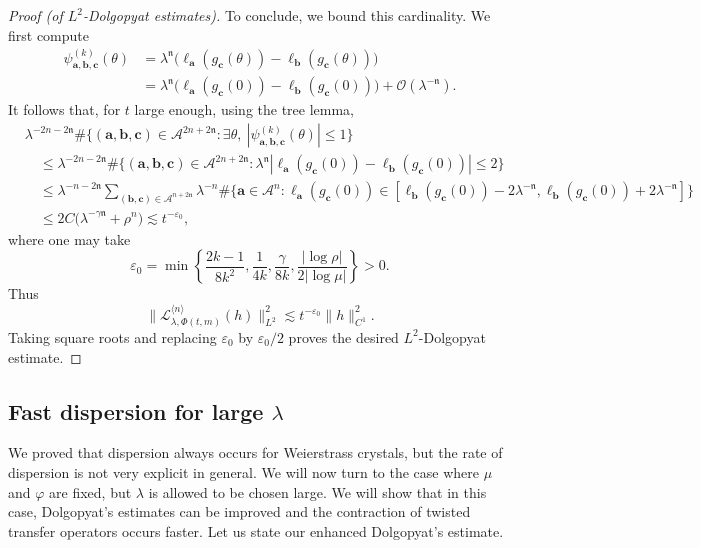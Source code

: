 \documentclass[11pt]{amsart}
\theoremstyle{plain}
\theoremstyle{definition}
\numberwithin{equation}{section}
\begin{document}
\begin{proof}[Proof (of $L^2$-Dolgopyat estimates)]
To conclude, we bound this cardinality. We first compute
\begin{align*}
\psi_{\mathbf{a},\mathbf{b},\mathbf{c}}^{(k)}(\theta) &= \lambda^{\mathfrak n}\big(\ell_{\mathbf a}(g_\mathbf c(\theta))-\ell_{\mathbf b}(g_\mathbf c(\theta))\big) \\
&= \lambda^{\mathfrak n}\big(\ell_{\mathbf a}(g_\mathbf c(0))-\ell_{\mathbf b}(g_\mathbf c(0))\big)+\mathcal O(\lambda^{-\mathfrak n}).
\end{align*}
It follows that, for $t$ large enough, using the tree lemma,
\begin{align*}
&\lambda^{-2n-2\mathfrak n}\#\{(\mathbf a,\mathbf b,\mathbf c)\in\mathcal A^{2n+2\mathfrak n}:\exists\theta,\ |\psi_{\mathbf a,\mathbf b,\mathbf c}^{(k)}(\theta)|\leq1\} \\
&\quad\leq\lambda^{-2n-2\mathfrak n}\#\{(\mathbf a,\mathbf b,\mathbf c)\in\mathcal A^{2n+2\mathfrak n}:\lambda^{\mathfrak n}|\ell_{\mathbf a}(g_\mathbf c(0))-\ell_{\mathbf b}(g_\mathbf c(0))|\leq2\} \\
&\quad\leq\lambda^{-n-2\mathfrak n}\sum_{(\mathbf b,\mathbf c)\in\mathcal A^{n+2\mathfrak n}}\lambda^{-n}\#\{\mathbf a\in\mathcal A^n:\ell_\mathbf a(g_\mathbf c(0))\in[\ell_\mathbf b(g_\mathbf c(0))-2\lambda^{-\mathfrak n},\ell_\mathbf b(g_\mathbf c(0))+2\lambda^{-\mathfrak n}]\} \\
&\quad\leq2C\big(\lambda^{-\gamma\mathfrak n}+\rho^n\big)\lesssim t^{-\varepsilon_0},
\end{align*}
where one may take
$$
\varepsilon_0=\min\left\{\frac{2k-1}{8k^2},\frac{1}{4k},\frac{\gamma}{8k},\frac{|\log\rho|}{2|\log\mu|}\right\}>0.
$$
Thus
$$
\Big\| \mathcal{L}_{\lambda,\Phi(t,m)}^{\langle n \rangle}(h) \Big\|_{L^2}^2
\lesssim t^{-\varepsilon_0}\|h\|_{C^1}^2.
$$
Taking square roots and replacing $\varepsilon_0$ by $\varepsilon_0/2$ proves the desired $L^2$-Dolgopyat estimate.
\end{proof}

\subsection{Fast dispersion for large $\lambda$}

We proved that dispersion always occurs for Weierstrass crystals, but the rate of dispersion is not very explicit in general. We will now turn to the case where $\mu$ and $\varphi$ are fixed, but $\lambda$ is allowed to be chosen large. We will show that in this case, Dolgopyat's estimates can be improved and the contraction of twisted transfer operators occurs faster. Let us state our enhanced Dolgopyat's estimate.
\end{document}
